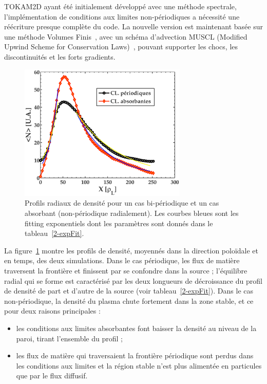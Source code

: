 \begin{refsection}
	TOKAM2D ayant été initialement
	développé avec une méthode spectrale, l'implémentation de conditions aux
	limites non-périodiques a nécessité une réécriture presque complète du code.
	La nouvelle version est maintenant basée sur une méthode Volumes
	Finis~\parencite{toro}, avec un schéma d'advection MUSCL (Modified Upwind
	Scheme for Conservation Laws)~\parencite{vanLeer}, pouvant supporter les chocs,
	les discontinuités et les forts gradients.
	
\begin{figure}[!htbp]
\centering
    \includegraphics[width=8cm]{figures/2-profileDenNoLimit.eps}
    \caption{Profils radiaux
    de densité pour un cas bi-périodique et un cas absorbant
    (non-périodique radialement)\label{2-profileDenNoLimit}. Les courbes bleues
    sont les fitting exponentiels dont les paramètres sont
    donnés dans le tableau~\ref{2-expFit}.}
\end{figure}

	La figure~\ref{2-profileDenNoLimit} montre les profils de densité, moyennés
	dans la direction poloïdale et en temps, des deux simulations.
	Dans le cas périodique, les flux de matière
	traversent la frontière et finissent par se confondre dans la source ;
	l'équilibre radial qui se forme est caractérisé par les deux longueurs de
	décroissance du profil de densité de part et d'autre de la source (voir tableau~\ref{2-expFit}).
	Dans le cas non-périodique, la densité du plasma chute fortement dans la zone
	stable, et ce pour deux raisons principales :
	
	\begin{itemize}
	  \item les conditions aux limites absorbantes font baisser la densité au
	  niveau de la paroi, tirant l'ensemble du profil ;
	  \item les flux de matière qui traversaient la frontière périodique sont
	  perdus dans les conditions aux limites et la région stable n'est plus
	  alimentée en particules que par le flux diffusif.
	 \end{itemize}
	

\end{refsection}
